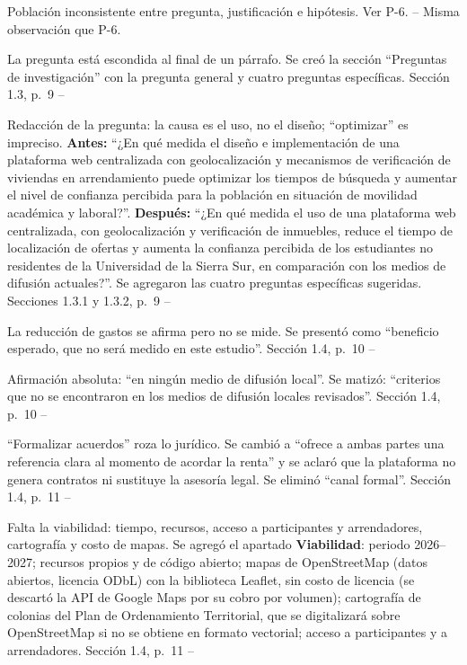 \documentclass[10pt]{article}
\begin{document}
\begin{matriz}
  {Población inconsistente entre pregunta, justificación e hipótesis.}
  {Ver P-6.}
  {--}
  {\Atendida}{Misma observación que P-6.}{}

  {La pregunta está escondida al final de un párrafo.}
  {Se creó la sección ``Preguntas de investigación'' con la pregunta general y cuatro preguntas específicas.}
  {Sección 1.3, p.~9}
  {\Atendida}{--}{}

  {Redacción de la pregunta: la causa es el uso, no el diseño; ``optimizar'' es impreciso.}
  {\textbf{Antes:} ``¿En qué medida el diseño e implementación de una plataforma web centralizada con geolocalización y mecanismos de verificación de viviendas en arrendamiento puede optimizar los tiempos de búsqueda y aumentar el nivel de confianza percibida para la población en situación de movilidad académica y laboral?''.\newline
   \textbf{Después:} ``¿En qué medida el uso de una plataforma web centralizada, con geolocalización y verificación de inmuebles, reduce el tiempo de localización de ofertas y aumenta la confianza percibida de los estudiantes no residentes de la Universidad de la Sierra Sur, en comparación con los medios de difusión actuales?''.\newline
   Se agregaron las cuatro preguntas específicas sugeridas.}
  {Secciones 1.3.1 y 1.3.2, p.~9}
  {\Atendida}{--}{}

  {La reducción de gastos se afirma pero no se mide.}
  {Se presentó como ``beneficio esperado, que no será medido en este estudio''.}
  {Sección 1.4, p.~10}
  {\Atendida}{--}{}

  {Afirmación absoluta: ``en ningún medio de difusión local''.}
  {Se matizó: ``criterios que no se encontraron en los medios de difusión locales revisados''.}
  {Sección 1.4, p.~10}
  {\Atendida}{--}{}

  {``Formalizar acuerdos'' roza lo jurídico.}
  {Se cambió a ``ofrece a ambas partes una referencia clara al momento de acordar la renta'' y se aclaró que la plataforma no genera contratos ni sustituye la asesoría legal. Se eliminó ``canal formal''.}
  {Sección 1.4, p.~11}
  {\Atendida}{--}{}

  {Falta la viabilidad: tiempo, recursos, acceso a participantes y arrendadores, cartografía y costo de mapas.}
  {Se agregó el apartado \textbf{Viabilidad}: periodo 2026--2027; recursos propios y de código abierto; mapas de OpenStreetMap (datos abiertos, licencia ODbL) con la biblioteca Leaflet, sin costo de licencia (se descartó la API de Google Maps por su cobro por volumen); cartografía de colonias del Plan de Ordenamiento Territorial, que se digitalizará sobre OpenStreetMap si no se obtiene en formato vectorial; acceso a participantes y a arrendadores.}
  {Sección 1.4, p.~11}
  {\Atendida}{--}{}


\end{matriz}
\end{document}
